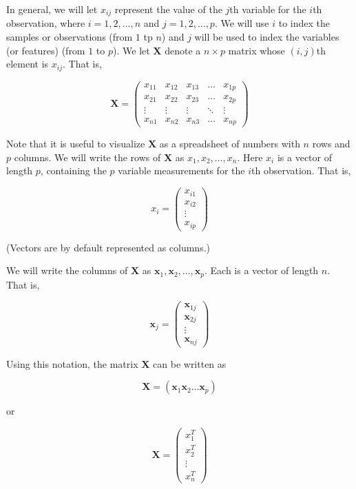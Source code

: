 \documentclass[]{book}
\begin{document}
In general, we will let \(x_{ij}\) represent the value of the \(j\)th
variable for the \(i\)th observation, where \(i=1,2,\ldots,n\) and
\(j=1,2,\ldots,p\). We will use \(i\) to index the samples or
observations (from \(1\) tp \(n\)) and \(j\) will be used to index the
variables (or features) (from \(1\) to \(p\)). We let \(\textbf{X}\)
denote a \(n \times p\) matrix whose \((i,j)\)th element is \(x_{ij}\).
That is,

\[ \textbf{X}  = \begin{pmatrix}
    x_{11} & x_{12} & x_{13} & \dots  & x_{1p} \\
    x_{21} & x_{22} & x_{23} & \dots  & x_{2p} \\
    \vdots & \vdots & \vdots & \ddots & \vdots \\
    x_{n1} & x_{n2} & x_{n3} & \dots  & x_{np}
\end{pmatrix} \]

Note that it is useful to visualize \(\textbf{X}\) as a spreadsheet of
numbers with \(n\) rows and \(p\) columns. We will write the rows of
\(\textbf{X}\) as \(x_1 , x_2 , \ldots, x_n\). Here \(x_i\) is a vector
of length \(p\), containing the \(p\) variable measurements for the
\(i\)th observation. That is,

\[ x_i = \begin{pmatrix}
    x_{i1} \\
    x_{i2} \\
    \vdots \\
    x_{ip}
\end{pmatrix}\]

(Vectors are by default represented as columns.)

We will write the columns of \(\textbf{X}\) as
\(\textbf{x}_1 , \textbf{x}_2, \ldots, \textbf{x}_p\). Each is a vector
of length \(n\). That is,

\[ \textbf{x}_j = \begin{pmatrix}
    \textbf{x}_{1j} \\
    \textbf{x}_{2j} \\
    \vdots \\
    \textbf{x}_{nj}
\end{pmatrix}\]

Using this notation, the matrix \(\textbf{X}\) can be written as

\[ \textbf{X} = (\textbf{x}_1  \textbf{x}_2 \ldots \textbf{x}_p) \]

or

\[ \textbf{X} = \begin{pmatrix}
    x_{1}^T \\
    x_{2}^T \\
    \vdots \\
    x_{n}^T
\end{pmatrix}\]
\end{document}
